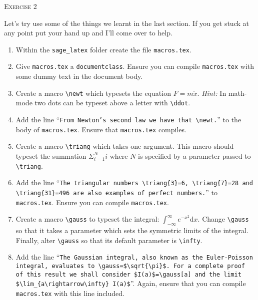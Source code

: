 \documentclass{article}
\newcommand{\tb}{\textbackslash}
\begin{document}
\begin{center}
  \Large\textsc{Exercise 2}
\end{center}

\noindent Let's try use some of the things we learnt in the last section. If you
get stuck at any point put your hand up and I'll come over to help.\\

\begin{enumerate}

  \item Within the \texttt{sage\_latex} folder create the file
  \texttt{macros.tex}.

  \item Give \texttt{macros.tex} a \texttt{documentclass}.
  Ensure you can compile \texttt{macros.tex} with some dummy text in the document
  body.

  \item Create a macro \texttt{\tb newt} which typesets the 
  equation $F = m \ddot{x}$. \textsl{Hint:} In math-mode two dots can be typeset
  above a letter with \texttt{\tb ddot}.

  \item Add the line ``\texttt{From Newton's second law we have that
  \tb newt.}'' to the body of \texttt{macros.tex}. Ensure that 
  \texttt{macros.tex} compiles.

  \item Create a macro \texttt{\tb triang} which takes one argument.
  This macro should typeset the summation $\Sigma_{i=1}^N i$ where $N$ is 
  specified by a parameter passed to \texttt{\tb triang}.

  \item Add the line ``\texttt{The triangular numbers
  \tb triang\{3\}=6, \tb triang\{7\}=28 
  and \tb triang\{31\}=496 are also examples of perfect numbers.}''
  to \texttt{macros.tex}. Ensure you can compile \texttt{macros.tex}.
  
  \item Create a macro \texttt{\tb gauss} to typeset the 
  integral: $\int_{-\infty}^{\infty} e^{-x^2} \textrm{d}x$. Change
  \texttt{\tb gauss} so that it takes a parameter which sets the
  symmetric limits of the integral. Finally, alter \texttt{\tb gauss}
  so that its default parameter is \texttt{\tb infty}.

  \item Add the line ``\texttt{The Gaussian integral, also known as the
  Euler-Poisson integral, evaluates to
  \tb gauss=\$\tb sqrt\{\tb pi\}\$. For
  a complete proof \\ of this result we shall consider \$I(a)\$=\tb gauss[a]
  and the limit \\\$\tb lim\_\{a\tb rightarrow\tb infty\} I(a)\$}''. Again,
  ensure that you can compile\\ \texttt{macros.tex} with this line included.
 
\end{enumerate}
\end{document}
